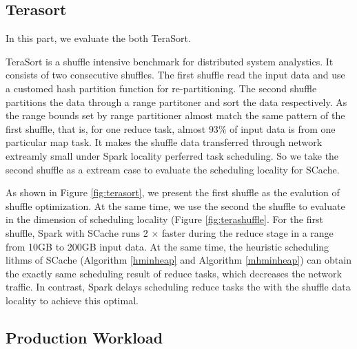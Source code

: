 \subsection{Terasort}
In this part, we evaluate the both TeraSort\cite{spark-tera}. 

TeraSort\cite{spark-tera} is a shuffle intensive benchmark for distributed system analystics. It consists of two consecutive shuffles. The first shuffle read the input data and use a customed hash partition function for re-partitioning. The second shuffle partitions the data through a range partitoner and sort the data respectively. As the range bounds set by range partitioner almost match the same pattern of the first shuffle, that is, for one reduce task, almost $93\%$ of input data is from one particular map task. It makes the shuffle data transferred through network extreamly small under Spark locality perferred task scheduling. So we take the second shuffle as a extream case to evaluate the scheduling locality for SCache. 

As shown in Figure \ref{fig:terasort}, we present the first shuffle as the evalution of shuffle optimization. At the same time, we use the second the shuffle to evaluate in the dimension of scheduling locality (Figure \ref{fig:terashuffle}. For the first shuffle, Spark with SCache runs 2 $\times$ faster during the reduce stage in a range from 10GB to 200GB input data. At the same time, the heuristic scheduling lithms of SCache (Algorithm \ref{hminheap} and Algorithm \ref{mhminheap}) can obtain the exactly same scheduling result of reduce tasks, which decreases the network traffic. In contrast, Spark delays scheduling reduce tasks the with the shuffle data locality to achieve this optimal.

\subsection{Production Workload}

